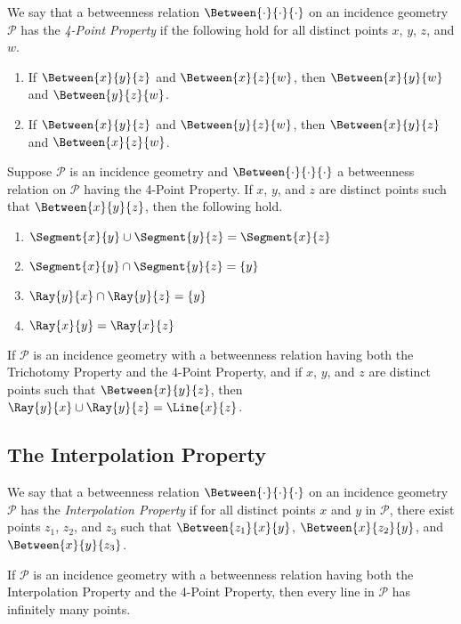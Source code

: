 \documentclass{article}
\begin{document}
\begin{dfn}
We say that a betweenness relation $\Between{\cdot}{\cdot}{\cdot}$ on an incidence geometry $\mathcal{P}$ has the \emph{4-Point Property} if the following hold for all distinct points $x$, $y$, $z$, and $w$.
\begin{enumerate}
\item If $\Between{x}{y}{z}$ and $\Between{x}{z}{w}$, then $\Between{x}{y}{w}$ and $\Between{y}{z}{w}$.
\item If $\Between{x}{y}{z}$ and $\Between{y}{z}{w}$, then $\Between{x}{y}{z}$ and $\Between{x}{z}{w}$.
\end{enumerate}
\end{dfn}

\begin{prop}
Suppose $\mathcal{P}$ is an incidence geometry and $\Between{\cdot}{\cdot}{\cdot}$ a betweenness relation on $\mathcal{P}$ having the 4-Point Property. If $x$, $y$, and $z$ are distinct points such that $\Between{x}{y}{z}$, then the following hold.
\begin{enumerate}
\item $\Segment{x}{y} \cup \Segment{y}{z} = \Segment{x}{z}$
\item $\Segment{x}{y} \cap \Segment{y}{z} = \{y\}$
\item $\Ray{y}{x} \cap \Ray{y}{z} = \{y\}$
\item $\Ray{x}{y} = \Ray{x}{z}$
\end{enumerate}
\end{prop}

\begin{prop}
If $\mathcal{P}$ is an incidence geometry with a betweenness relation having both the Trichotomy Property and the 4-Point Property, and if $x$, $y$, and $z$ are distinct points such that $\Between{x}{y}{z}$, then $\Ray{y}{x} \cup \Ray{y}{z} = \Line{x}{z}$.
\end{prop}



\subsection*{The Interpolation Property}

\begin{dfn}
We say that a betweenness relation $\Between{\cdot}{\cdot}{\cdot}$ on an incidence geometry $\mathcal{P}$ has the \emph{Interpolation Property} if for all distinct points $x$ and $y$ in $\mathcal{P}$, there exist points $z_1$, $z_2$, and $z_3$ such that $\Between{z_1}{x}{y}$, $\Between{x}{z_2}{y}$, and $\Between{x}{y}{z_3}$.
\end{dfn}

\begin{prop}
If $\mathcal{P}$ is an incidence geometry with a betweenness relation having both the Interpolation Property and the 4-Point Property, then every line in $\mathcal{P}$ has infinitely many points.
\end{prop}
\end{document}
